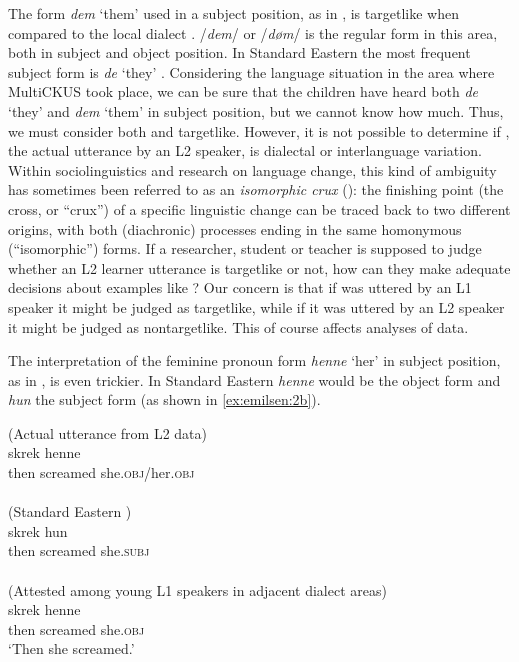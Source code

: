 \documentclass[output=paper,colorlinks,citecolor=brown,modfonts,nonflat]{../langscibook}
\begin{document}
The form \textit{dem} ‘them’ used in a subject position, as in , is targetlike when compared to the local dialect . /\textit{dem}/ or /\textit{døm}/ is the regular form in this area, both in subject and object position. In Standard Eastern  the most frequent subject form is \textit{de} ‘they’ . Considering the language situation in the area where MultiCKUS took place, we can be sure that the children have heard both \textit{de} ‘they’ and \textit{dem} ‘them’ in subject position, but we cannot know how much. Thus, we must consider both  and  targetlike. However, it is not possible to determine if , the actual utterance by an L2 speaker, is dialectal or interlanguage variation. Within sociolinguistics and research on language change, this kind of ambiguity has sometimes been referred to as an \textit{isomorphic crux} (\citealt{Hårstad2009}): the finishing point (the cross, or ``crux'') of a specific linguistic change can be traced back to two different origins, with both (diachronic) processes ending in the same homonymous (``isomorphic'') forms. If a researcher, student or teacher is supposed to judge whether an L2 learner utterance is targetlike or not, how can they make adequate decisions about examples like ? Our concern is that if  was uttered by an L1 speaker it might be judged as targetlike, while if it was uttered by an L2 speaker it might be judged as nontargetlike. This of course affects analyses of data.

The interpretation of the feminine pronoun form \textit{henne} ‘her’ in subject position, as in , is even trickier. In Standard Eastern  \textit{henne} would be the object form and \textit{hun} the subject form (as shown in \ref{ex:emilsen:2b}).


\ea\label{ex:emilsen:2}
\ea\label{ex:emilsen:2a}
(Actual utterance from L2 data)\\
  {skrek}  {henne}\\
 then screamed she\textsc{.obj}/her\textsc{.obj} \\
  \\
 \newpage
\ex\label{ex:emilsen:2b}
(Standard Eastern )\\
  {skrek}  {hun}\\
 then screamed she\textsc{.subj} \\
  \\
\ex\label{ex:emilsen:2c}
(Attested among young L1 speakers  in adjacent dialect areas)\\
  {skrek}  {henne}\\
 then screamed she\textsc{.obj}\\
 \glt ‘Then she screamed.’\\
\z
\z
\end{document}
